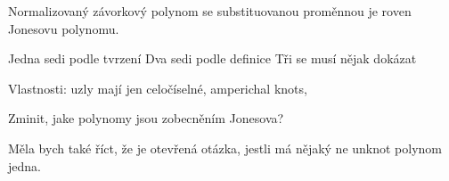 \begin{veta}
Normalizovaný závorkový polynom se substituovanou proměnnou je roven Jonesovu polynomu.
\end{veta}
\begin{dukaz}
Jedna sedi podle tvrzení
Dva sedi podle definice
Tři se musí nějak dokázat
\end{dukaz}



Vlastnosti:
uzly mají jen celočíselné, amperichal knots, 

Zminit, jake polynomy jsou zobecněním Jonesova?

Měla bych také říct, že je otevřená otázka, jestli má nějaký ne unknot polynom jedna.